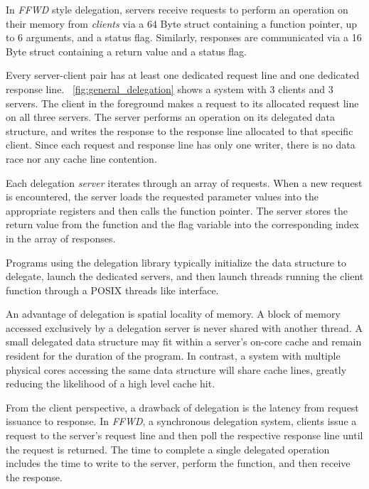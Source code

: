 \documentclass{uicthesi}
\begin{document}
In \textit{FFWD} style delegation, servers receive requests to perform an operation on their memory from \textit{clients} via a 64 Byte struct containing a function pointer, up to 6 arguments, and a status flag. Similarly, responses are communicated via a 16 Byte struct containing a return value and a status flag.  

Every server-client pair has at least one dedicated request line and one dedicated response line. ~\ref{fig:general_delegation} shows a system with 3 clients and 3 servers. The client in the foreground makes a request to its allocated request line on all three servers. The server performs an operation on its delegated data structure, and writes the response to the response line allocated to that specific client. Since each request and response line has only one writer, there is no data race nor any cache line contention.

Each delegation \textit{server} iterates through an array of requests. When a new request is encountered, the server loads the requested parameter values into the appropriate registers and then calls the function pointer. The server stores the return value from the function and the flag variable into the corresponding index in the array of responses.  

Programs using the delegation library typically initialize the data structure to delegate, launch the dedicated servers, and then launch threads running the client function through a POSIX threads like interface. 

An advantage of delegation is spatial locality of memory. A block of memory accessed exclusively by a delegation server is never shared with another thread. A small delegated data structure may fit within a server's on-core cache and remain resident for the duration of the program. In contrast, a system with multiple physical cores accessing the same data structure will share cache lines, greatly reducing the likelihood of a high level cache hit. 

From the client perspective, a drawback of delegation is the latency from request issuance to response. In \textit{FFWD}, a synchronous delegation system, clients issue a request to the server's request line and then poll the respective response line until the request is returned. The time to complete a single delegated operation includes the time to write to the server, perform the function, and then receive the response. 
\end{document}
